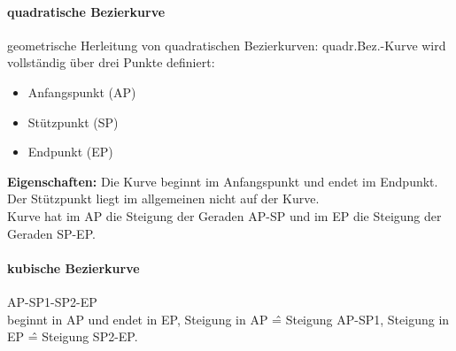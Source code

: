 \paragraph{quadratische Bezierkurve}
geometrische Herleitung von quadratischen Bezierkurven:
quadr.Bez.-Kurve wird vollständig über drei Punkte definiert:
\begin{itemize}
\item Anfangspunkt (AP)
\item Stützpunkt (SP)
\item Endpunkt (EP)
\end{itemize}
\textbf{Eigenschaften:} Die Kurve beginnt im Anfangspunkt und endet im Endpunkt. Der Stützpunkt liegt im allgemeinen nicht auf der Kurve.\\
Kurve hat im AP die Steigung der Geraden AP-SP und im EP die Steigung der Geraden SP-EP.
\paragraph{kubische Bezierkurve}
AP-SP1-SP2-EP\\
beginnt in AP und endet in EP, Steigung in AP \^= Steigung AP-SP1, Steigung in EP \^= Steigung SP2-EP.\\
